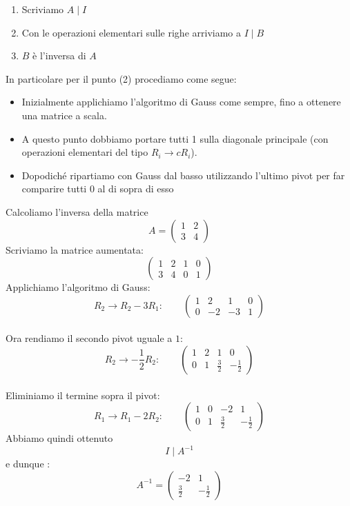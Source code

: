 \documentclass[
  a4paper,
]{article}
\providecommand{\tightlist}{%
  \setlength{\itemsep}{0pt}\setlength{\parskip}{0pt}}
\providecommand{\tightlist}{}
\begin{document}
\begin{enumerate}
\def\labelenumi{\arabic{enumi}.}
\tightlist
\item
  Scriviamo \(A \mid I\)
\item
  Con le operazioni elementari sulle righe arriviamo a \(I \mid B\)
\item
  \(B\) è l'inversa di \(A\)
\end{enumerate}

In particolare per il punto (2) procediamo come segue:

\begin{itemize}
\tightlist
\item
  Inizialmente applichiamo l'algoritmo di Gauss come sempre, fino a
  ottenere una matrice a scala.
\item
  A questo punto dobbiamo portare tutti 1 sulla diagonale principale
  (con operazioni elementari del tipo \(R_i \to cR_i\)).\\
\item
  Dopodiché ripartiamo con Gauss dal basso utilizzando l'ultimo pivot
  per far comparire tutti 0 al di sopra di esso
\end{itemize}

\begin{examplebox}
Calcoliamo l'inversa della matrice\\
\[  
A =  
\begin{pmatrix}  
1 & 2 \\  
3 & 4  
\end{pmatrix}  
\] Scriviamo la matrice aumentata:\\
\[  
\left(  
\begin{array}{cc|cc}  
1 & 2 & 1 & 0 \\  
3 & 4 & 0 & 1  
\end{array}  
\right)  
\] Applichiamo l'algoritmo di Gauss:\\
\[  
R_2 \to R_2 - 3R_1  : \qquad
\left(  
\begin{array}{cc|cc}  
1 & 2 & 1 & 0 \\  
0 & -2 & -3 & 1  
\end{array}  
\right)  
\]\\
Ora rendiamo il secondo pivot uguale a \(1\):\\
\[  
R_2 \to -\frac{1}{2} R_2  : \qquad
\left(  
\begin{array}{cc|cc}  
1 & 2 & 1 & 0 \\  
0 & 1 & \frac{3}{2} & -\frac{1}{2}  
\end{array}  
\right)  
\]\\
Eliminiamo il termine sopra il pivot:\\
\[
R_1 \to R_1 - 2R_2 :  \qquad
\left(  
\begin{array}{cc|cc}  
1 & 0 & -2 & 1 \\  
0 & 1 & \frac{3}{2} & -\frac{1}{2}  
\end{array}  
\right)  
\] Abbiamo quindi ottenuto\\
\[  
I \mid A^{-1}  
\]e dunque : \[  
A^{-1} =  
\begin{pmatrix}  
-2 & 1 \\  
\frac{3}{2} & -\frac{1}{2}  
\end{pmatrix}  
\]
\end{examplebox}
\end{document}
